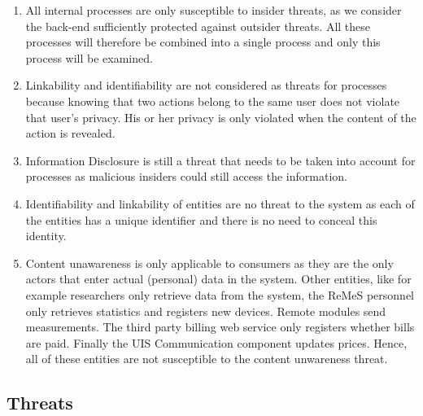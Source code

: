 \begin{enumerate}
  \item All internal processes are only susceptible to insider threats, as we
  consider the back-end sufficiently protected against outsider threats. All
  these processes will therefore be combined into a single process and only
  this process will be examined. 
  \item Linkability and identifiability are not considered as threats for
  processes because knowing that two actions belong to the same user does not
  violate that user's privacy. His or her privacy is only violated when the
  content of the action is revealed.
  \item Information Disclosure is still a threat that needs to be taken into
  account for processes as malicious insiders could still access the
  information.
  
  \item Identifiability and linkability of entities are no threat to the system
  as each of the entities has a unique identifier and there is no need to
  conceal this identity. 
  \item Content unawareness is only applicable to consumers as they are the only
  actors that enter actual (personal) data in the system. Other entities, like
  for example researchers only retrieve data from the system, the ReMeS
  personnel only retrieves statistics and registers new devices. Remote modules
  send measurements. The third party billing web service only registers whether
  bills are paid. Finally the UIS Communication component updates prices.
  Hence, all of these entities are not susceptible to the content unwareness
  threat.
\end{enumerate}

\subsection{Threats}
\label{sec:threats}












